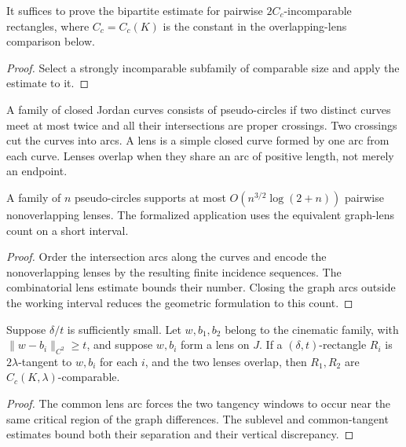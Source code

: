 \begin{lemma}
\label{lem:incomparability-reduction}
It suffices to prove the bipartite estimate for pairwise
$2C_c$-incomparable rectangles, where $C_c=C_c(K)$ is the
constant in the overlapping-lens comparison below.
\end{lemma}
\begin{proof}
Select a strongly incomparable subfamily of comparable size
and apply the estimate to it.
\end{proof}

\begin{definition}
\label{def:pseudocircles}
A family of closed Jordan curves consists of pseudo-circles
if two distinct curves meet at most twice and all their
intersections are proper crossings. Two crossings cut the
curves into arcs. A lens is a simple closed curve formed by
one arc from each curve. Lenses overlap when they share an
arc of positive length, not merely an endpoint.
\end{definition}

\begin{theorem}
\label{thm:lens-count}
A family of $n$ pseudo-circles supports at most
$O(n^{3/2}\log(2+n))$ pairwise nonoverlapping lenses.
The formalized application uses the equivalent graph-lens
count on a short interval.
\end{theorem}
\begin{proof}
Order the intersection arcs along the curves and encode
the nonoverlapping lenses by the resulting finite incidence
sequences. The combinatorial lens estimate bounds their
number. Closing the graph arcs outside the working interval
reduces the geometric formulation to this count.
\end{proof}

\begin{lemma}
\label{lem:lens-comparability}
Suppose $\delta/t$ is sufficiently small. Let $w,b_1,b_2$
belong to the cinematic family, with $\|w-b_i\|_{C^2}\geq t$,
and suppose $w,b_i$ form a lens on $J$. If a
$(\delta,t)$-rectangle $R_i$ is $2\lambda$-tangent to
$w,b_i$ for each $i$, and the two lenses overlap, then
$R_1,R_2$ are $C_c(K,\lambda)$-comparable.
\end{lemma}
\begin{proof}
The common lens arc forces the two tangency windows to
occur near the same critical region of the graph
differences. The sublevel and common-tangent estimates
bound both their separation and their vertical discrepancy.
\end{proof}

